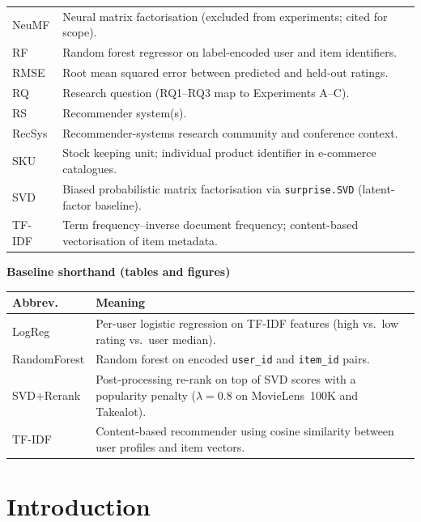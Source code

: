 \documentclass[11pt,a4paper]{report}
\begin{document}
\begin{tabularx}{\textwidth}{@{}L{0.17\textwidth}X@{}}
  NeuMF & Neural matrix factorisation (excluded from experiments; cited for scope). \\
  RF & Random forest regressor on label-encoded user and item identifiers. \\
  RMSE & Root mean squared error between predicted and held-out ratings. \\
  RQ & Research question (RQ1--RQ3 map to Experiments A--C). \\
  RS & Recommender system(s). \\
  RecSys & Recommender-systems research community and conference context. \\
  SKU & Stock keeping unit; individual product identifier in e-commerce catalogues. \\
  SVD & Biased probabilistic matrix factorisation via \texttt{surprise.SVD} (latent-factor baseline). \\
  TF-IDF & Term frequency--inverse document frequency; content-based vectorisation of item metadata. \\
  \bottomrule
\end{tabularx}

\vspace{1em}
\noindent\textbf{Baseline shorthand (tables and figures)}
\vspace{0.35em}

\noindent\begin{tabularx}{\textwidth}{@{}L{0.17\textwidth}X@{}}
  \toprule
  \textbf{Abbrev.} & \textbf{Meaning} \\
  \midrule
  LogReg & Per-user logistic regression on TF-IDF features (high vs.\ low rating vs.\ user median). \\
  RandomForest & Random forest on encoded \texttt{user\_id} and \texttt{item\_id} pairs. \\
  SVD+Rerank & Post-processing re-rank on top of SVD scores with a popularity penalty ($\lambda{=}0.8$ on MovieLens~100K and Takealot). \\
  TF-IDF & Content-based recommender using cosine similarity between user profiles and item vectors. \\
  \bottomrule
\end{tabularx}

\newpage

\chapter{Introduction}
\label{ch:introduction}
\end{document}
